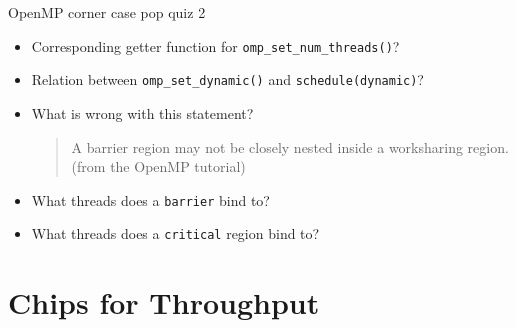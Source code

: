 \documentclass[english,compress]{beamer}
\begin{document}
\begin{frame}{OpenMP corner case pop quiz 2}
  \begin{itemize}[<+->]
    \item Corresponding getter function for
      \texttt{omp\_set\_num\_threads()}?
    \item Relation between
      \texttt{omp\_set\_dynamic()} and \texttt{schedule(dynamic)}?
    \item What is wrong with this statement?
      \begin{quote}
        A barrier region may not be closely nested inside a
        worksharing region. \hfill {\footnotesize (from the OpenMP tutorial)}
      \end{quote}
    \item What threads does a \texttt{barrier} bind to?
    \item What threads does a \texttt{critical} region bind to?
  \end{itemize}
\end{frame}
\section{Chips for Throughput}


\newcommand{\kayvoncredit}{
  \begin{tikzpicture}[overlay]
    \node [xshift=1cm,yshift=0.5cm]
      at (current page.south west)
      [font=\scriptsize,fill=gray!30,anchor=south west,opacity=0.5]
      {Credit: Kayvon Fatahalian (Stanford) };
  \end{tikzpicture}
}
\newcommand{\kayvonframe}[5]{

  \begin{frame}{#1}
    #4
    \begin{center}
    \texttt{[image: kayvon-gpuarch.pdf]}
    \end{center}
    \kayvoncredit
    #5
  \end{frame}
}
\end{document}
